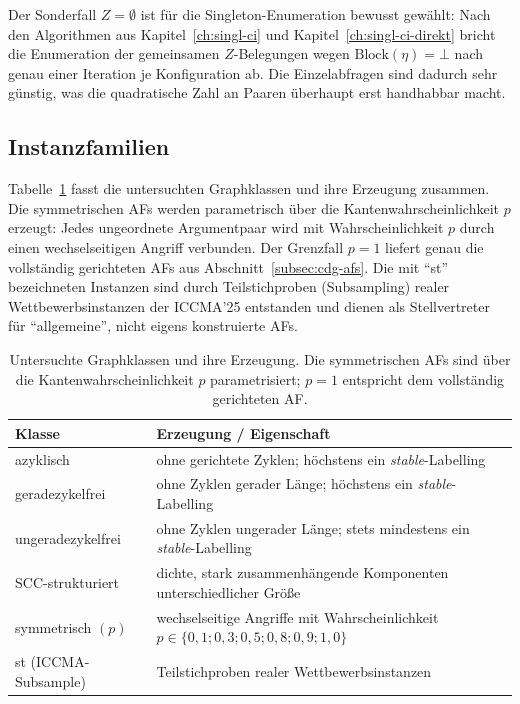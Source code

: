 Der Sonderfall \(Z=\emptyset\) ist f\"ur die Singleton-Enumeration bewusst
gew\"ahlt: Nach den Algorithmen aus Kapitel~\ref{ch:singl-ci} und
Kapitel~\ref{ch:singl-ci-direkt} bricht die Enumeration der gemeinsamen
\(Z\)-Belegungen wegen \(\mathrm{Block}(\eta)=\bot\) nach genau einer
Iteration je Konfiguration ab. Die Einzelabfragen sind dadurch sehr g\"unstig,
was die quadratische Zahl an Paaren \"uberhaupt erst handhabbar macht.

\subsection{Instanzfamilien}
\label{subsec:gce-instanzen}

Tabelle~\ref{tab:gce-familien} fasst die untersuchten Graphklassen und ihre
Erzeugung zusammen. Die symmetrischen AFs werden parametrisch \"uber die
Kantenwahrscheinlichkeit \(p\) erzeugt: Jedes ungeordnete Argumentpaar wird mit
Wahrscheinlichkeit \(p\) durch einen wechselseitigen Angriff verbunden. Der
Grenzfall \(p=1\) liefert genau die vollst\"andig gerichteten AFs aus
Abschnitt~\ref{subsec:cdg-afs}. Die mit \enquote{st} bezeichneten Instanzen
sind durch Teilstichproben (Subsampling) realer Wettbewerbsinstanzen der
ICCMA'25 entstanden und dienen als Stellvertreter f\"ur \enquote{allgemeine},
nicht eigens konstruierte AFs.

\begin{table}[htbp]
    \myfloatalign
    \begin{tabularx}{\textwidth}{lX} \toprule
        Klasse & Erzeugung / Eigenschaft \\ \midrule
        azyklisch            & ohne gerichtete Zyklen; h\"ochstens ein
                               \textit{stable}-Labelling \\
        geradezykelfrei      & ohne Zyklen gerader L\"ange; h\"ochstens ein
                               \textit{stable}-Labelling \\
        ungeradezykelfrei    & ohne Zyklen ungerader L\"ange; stets mindestens
                               ein \textit{stable}-Labelling \\
        SCC-strukturiert     & dichte, stark zusammenh\"angende Komponenten
                               unterschiedlicher Gr\"o\ss e \\
        symmetrisch \((p)\)  & wechselseitige Angriffe mit Wahrscheinlichkeit
                               \(p\in\{0{,}1;0{,}3;0{,}5;0{,}8;0{,}9;1{,}0\}\) \\
        st (ICCMA-Subsample) & Teilstichproben realer Wettbewerbsinstanzen \\
        \bottomrule
    \end{tabularx}
    \caption[Untersuchte Graphklassen]{Untersuchte Graphklassen und ihre
    Erzeugung. Die symmetrischen AFs sind \"uber die Kantenwahrscheinlichkeit
    \(p\) parametrisiert; \(p=1\) entspricht dem vollst\"andig gerichteten AF.}
    \label{tab:gce-familien}
\end{table}

